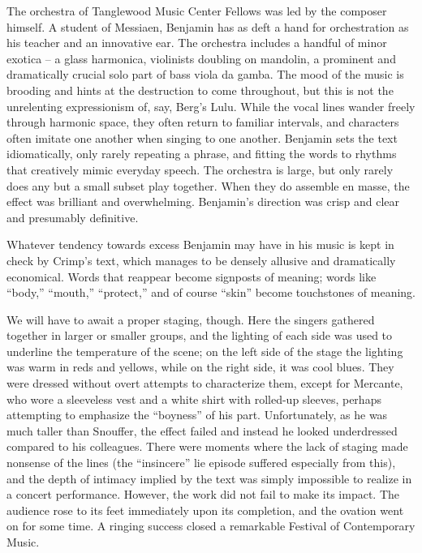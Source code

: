 The orchestra of Tanglewood Music Center Fellows was led by the composer himself. A student of Messiaen, Benjamin has as deft a hand for orchestration as his teacher and an innovative ear. The orchestra includes a handful of minor exotica – a glass harmonica, violinists doubling on mandolin, a prominent and dramatically crucial solo part of bass viola da gamba. The mood of the music is brooding and hints at the destruction to come throughout, but this is not the unrelenting expressionism of, say, Berg’s Lulu. While the vocal lines wander freely through harmonic space, they often return to familiar intervals, and characters often imitate one another when singing to one another. Benjamin sets the text idiomatically, only rarely repeating a phrase, and fitting the words to rhythms that creatively mimic everyday speech. The orchestra is large, but only rarely does any but a small subset play together. When they do assemble en masse, the effect was brilliant and overwhelming. Benjamin’s direction was crisp and clear and presumably definitive.

Whatever tendency towards excess Benjamin may have in his music is kept in check by Crimp’s text, which manages to be densely allusive and dramatically economical. Words that reappear become signposts of meaning; words like “body,” “mouth,” “protect,” and of course “skin” become touchstones of meaning.

We will have to await a proper staging, though. Here the singers gathered together in larger or smaller groups, and the lighting of each side was used to underline the temperature of the scene; on the left side of the stage the lighting was warm in reds and yellows, while on the right side, it was cool blues. They were dressed without overt attempts to characterize them, except for Mercante, who wore a sleeveless vest and a white shirt with rolled-up sleeves, perhaps attempting to emphasize the “boyness” of his part. Unfortunately, as he was much taller than Snouffer, the effect failed and instead he looked underdressed compared to his colleagues. There were moments where the lack of staging made nonsense of the lines (the “insincere” lie episode suffered especially from this), and the depth of intimacy implied by the text was simply impossible to realize in a concert performance. However, the work did not fail to make its impact. The audience rose to its feet immediately upon its completion, and the ovation went on for some time. A ringing success closed a remarkable Festival of Contemporary Music.
